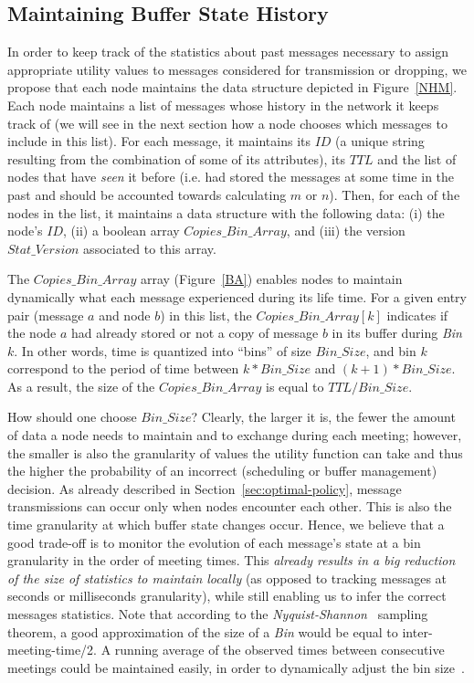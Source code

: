\subsection{Maintaining Buffer State History}
\label{NetworkHistoryModel}

In order to keep track of the statistics about past messages necessary to assign appropriate utility values to messages considered for transmission or dropping, we propose that each node maintains the data structure depicted in Figure~\ref{NHM}. Each node maintains a list of messages whose history in the network it keeps track of (we will see in the next section how a node chooses which messages to include in this list). For each message, it maintains its $ID$ (a unique string resulting from the combination of some of its attributes), its $TTL$ and the list of nodes that have \emph{seen} it before (i.e. had stored the messages at some time in the past and should be accounted towards calculating $m$ or $n$). Then, for each of the nodes in the list, it maintains a data structure with the following data: (i) the node's $ID$, (ii) a boolean array $Copies\_Bin\_Array$, and (iii) the version $Stat\_Version$ associated to this array.

The $Copies\_Bin\_Array$ array (Figure~\ref{BA}) enables nodes to maintain dynamically what each message experienced during its life time. For a given entry pair (message $a$ and node $b$) in this list, the $Copies\_Bin\_Array[k]$ indicates if the node $a$ had already stored or not a copy of message $b$ in its buffer during \emph{Bin} $k$. In other words, time is quantized into ``bins'' of size $Bin\_Size$, and bin $k$ correspond to the period of time between $k*Bin\_Size$ and $(k+1)*Bin\_Size$. As a result, the size of the $Copies\_Bin\_Array$ is equal to $TTL/Bin\_Size$.

How should one choose $Bin\_Size$? Clearly, the larger it is, the fewer the amount of data a node needs to maintain and to exchange during each meeting; however, the smaller is also the granularity of values the utility function can take and thus the higher the probability of an incorrect (scheduling or buffer management) decision. As already described in Section~\ref{sec:optimal-policy}, message transmissions can occur only when nodes encounter each other. This is also the time granularity at which buffer state changes occur. Hence, we believe that a good trade-off is to monitor the evolution of each message's state at a bin granularity in the order of meeting times. This \emph{already results in a big reduction of the size of statistics to maintain locally} (as opposed to tracking messages at seconds or milliseconds granularity), while still enabling us to infer the correct messages statistics. Note that according to the \emph{Nyquist-Shannon}~\cite{Nyquist} sampling theorem, a good approximation of the size of a \emph{Bin} would be equal to inter-meeting-time/2. A running average of the observed times between consecutive meetings could be maintained easily, in order to dynamically adjust the bin size~\cite{akis:ton-multi}. 

